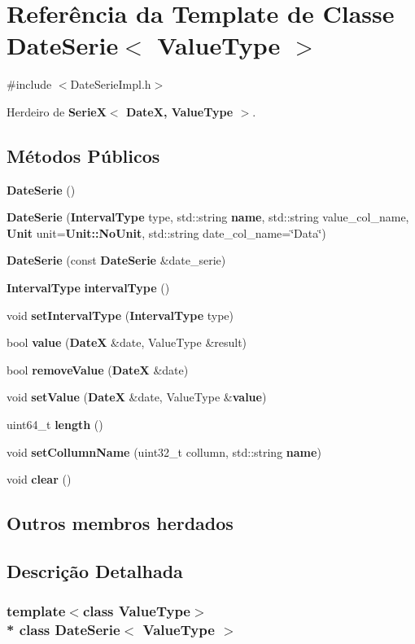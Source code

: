 \section{Referência da Template de Classe Date\+Serie$<$ Value\+Type $>$}
\label{class_date_serie}


{\ttfamily \#include $<$Date\+Serie\+Impl.\+h$>$}



Herdeiro de {\bf Serie\+X$<$ Date\+X, Value\+Type $>$}.

\subsection*{Métodos Públicos}
\begin{DoxyCompactItemize}
\item 
{\bf Date\+Serie} ()
\item 
{\bf Date\+Serie} ({\bf Interval\+Type} type, std\+::string {\bf name}, std\+::string value\+\_\+col\+\_\+name, {\bf Unit} unit={\bf Unit\+::\+No\+Unit}, std\+::string date\+\_\+col\+\_\+name=\char`\"{}Data\char`\"{})
\item 
{\bf Date\+Serie} (const {\bf Date\+Serie} \&date\+\_\+serie)
\item 
{\bf Interval\+Type} {\bf interval\+Type} ()
\item 
void {\bf set\+Interval\+Type} ({\bf Interval\+Type} type)
\item 
bool {\bf value} ({\bf DateX} \&date, Value\+Type \&result)
\item 
bool {\bf remove\+Value} ({\bf DateX} \&date)
\item 
void {\bf set\+Value} ({\bf DateX} \&date, Value\+Type \&{\bf value})
\item 
uint64\+\_\+t {\bf length} ()
\item 
void {\bf set\+Collumn\+Name} (uint32\+\_\+t collumn, std\+::string {\bf name})
\item 
void {\bf clear} ()
\end{DoxyCompactItemize}
\subsection*{Outros membros herdados}


\subsection{Descrição Detalhada}
\subsubsection*{template$<$class Value\+Type$>$\\*
class Date\+Serie$<$ Value\+Type $>$}



